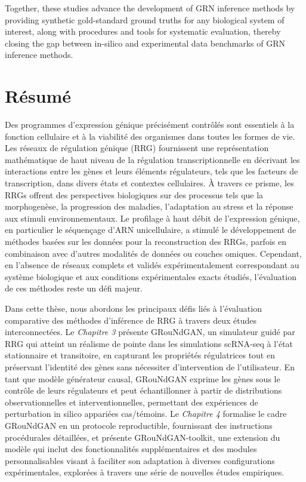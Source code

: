 Together, these studies advance the development of \textsc{GRN} inference methods by providing synthetic gold-standard ground truths for any biological system of interest, along with procedures and tools for systematic evaluation, thereby closing the gap between in-silico and experimental data benchmarks of \textsc{GRN} inference methods. 

\newpage

\chapter*{Résumé}

Des programmes d'expression génique précisément contrôlés sont essentiels à la fonction cellulaire et à la viabilité des organismes dans toutes les formes de vie. Les réseaux de régulation génique (RRG) fournissent une représentation mathématique de haut niveau de la régulation transcriptionnelle en décrivant les interactions entre les gènes et leurs éléments régulateurs, tels que les facteurs de transcription, dans divers états et contextes cellulaires. À travers ce prisme, les RRGs offrent des perspectives biologiques sur des processus tels que la morphogenèse, la progression des maladies, l'adaptation au stress et la réponse aux stimuli environnementaux. Le profilage à haut débit de l'expression génique, en particulier le séquençage d'ARN unicellulaire, a stimulé le développement de méthodes basées sur les données pour la reconstruction des RRGs, parfois en combinaison avec d'autres modalités de données ou couches omiques. Cependant, en l'absence de réseaux complets et validés expérimentalement correspondant au système biologique et aux conditions expérimentales exacts étudiés, l'évaluation de ces méthodes reste un défi majeur.

Dans cette thèse, nous abordons les principaux défis liés à l'évaluation comparative des méthodes d'inférence de RRG à travers deux études interconnectées. Le \textit{Chapitre 3} présente GRouNdGAN, un simulateur guidé par RRG qui atteint un réalisme de pointe dans les simulations scRNA-seq à l'état stationnaire et transitoire, en capturant les propriétés régulatrices tout en préservant l'identité des gènes sans nécessiter d'intervention de l'utilisateur. En tant que modèle générateur causal, GRouNdGAN exprime les gènes sous le contrôle de leurs régulateurs et peut échantillonner à partir de distributions observationnelles et interventionnelles, permettant des expériences de perturbation in silico appariées cas/témoins. Le \textit{Chapitre 4} formalise le cadre GRouNdGAN en un protocole reproductible, fournissant des instructions procédurales détaillées, et présente GRouNdGAN-toolkit, une extension du modèle qui inclut des fonctionnalités supplémentaires et des modules personnalisables visant à faciliter son adaptation à diverses configurations expérimentales, explorées à travers une série de nouvelles études empiriques.

